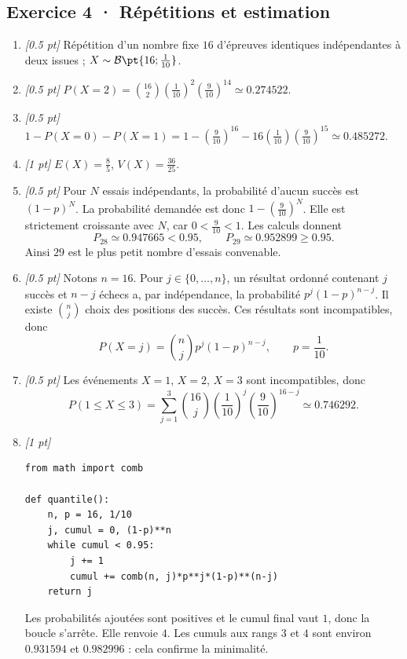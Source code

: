 \subsection*{Exercice 4 · Répétitions et estimation}\begin{enumerate}

\item \textit{[\num{0,5} pt]} Répétition d'un nombre fixe $16$ d'épreuves identiques indépendantes à deux issues ; $X\sim\mathcal B\pt{16;\frac{1}{10}}$.

\item \textit{[\num{0,5} pt]} $P(X=2)=\binom{16}2(\frac{1}{10})^2(\frac{9}{10})^{14}\simeq\num{0,274522}$.

\item \textit{[\num{0,5} pt]} $1-P(X=0)-P(X=1)=1-(\frac{9}{10})^{16}-16(\frac{1}{10})(\frac{9}{10})^{15}\simeq\num{0,485272}$.

\item \textit{[1 pt]} $E(X)=\frac{8}{5}$, $V(X)=\frac{36}{25}$.

\item \textit{[\num{0,5} pt]} Pour $N$ essais indépendants, la probabilité d'aucun succès est $(1-p)^N$. La probabilité demandée est donc $1-(\frac{9}{10})^N$. Elle est strictement croissante avec $N$, car $0<\frac{9}{10}<1$. Les calculs donnent
\[P_{28}\simeq\num{0,947665}<\num{0,95},\qquad P_{29}\simeq\num{0,952899}\ge\num{0,95}.\]
Ainsi $29$ est le plus petit nombre d'essais convenable.

\item \textit{[\num{0,5} pt]} Notons $n=16$. Pour $j\in\{0,\ldots,n\}$, un résultat ordonné contenant $j$ succès et $n-j$ échecs a, par indépendance, la probabilité $p^j(1-p)^{n-j}$. Il existe $\binom nj$ choix des positions des succès. Ces résultats sont incompatibles, donc
\[P(X=j)=\binom nj p^j(1-p)^{n-j},\qquad p=\frac{1}{10}.\]

\item \textit{[\num{0,5} pt]} Les événements $X=1$, $X=2$, $X=3$ sont incompatibles, donc
\[P(1\le X\le3)=\sum_{j=1}^3\binom{16}j(\frac{1}{10})^j(\frac{9}{10})^{16-j}\simeq\num{0,746292}.\]


\item \textit{[1 pt]} 
\begin{lstlisting}
from math import comb

def quantile():
    n, p = 16, 1/10
    j, cumul = 0, (1-p)**n
    while cumul < 0.95:
        j += 1
        cumul += comb(n, j)*p**j*(1-p)**(n-j)
    return j
\end{lstlisting}
Les probabilités ajoutées sont positives et le cumul final vaut $1$, donc la boucle s'arrête. Elle renvoie $4$. Les cumuls aux rangs $3$ et $4$ sont environ $\num{0,931594}$ et $\num{0,982996}$ : cela confirme la minimalité.

\end{enumerate}

